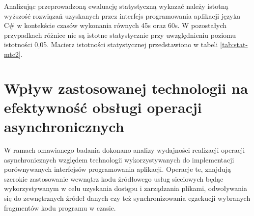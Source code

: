 Analizując przeprowadzoną ewaluację statystyczną wykazać należy istotną wyższość rozwiązań uzyskanych przez interfejs programowania aplikacji języka C\# w kontekście czasów wykonania równych 45s oraz 60s. W pozostałych przypadkach różnice nie są istotne statystycznie przy uwzględnieniu poziomu istotności 0,05. Macierz istotności statystycznej przedstawiono w tabeli \ref{tab:stat-mtc2}.

\begin{table}[htb]
  \centering
  \caption{Macierz istotności statystycznej dla współczynników jakości rozwiązania pozyskanych w ramach badania wydajności obsługi operacji współbieżnych}
  \label{tab:stat-mtc2}
  \end{table}

\section{Wpływ zastosowanej technologii na efektywność obsługi operacji asynchronicznych}
W ramach omawianego badania dokonano analizy wydajności realizacji operacji asynchronicznych względem technologii wykorzystywanych do implementacji porównywanych interfejsów programowania aplikacji. Operacje te, znajdują szerokie zastosowanie wewnątrz kodu źródłowego usług sieciowych będąc wykorzystywanym w celu uzyskania dostępu i zarządzania plikami, odwoływania się do zewnętrznych źródeł danych czy też synchronizowania egzekucji wybranych fragmentów kodu programu w czasie.

